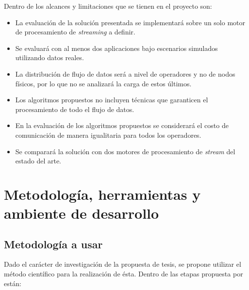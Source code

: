 \documentclass[12pt,letterpaper]{article}
\begin{document}
Dentro de los alcances y limitaciones que se tienen en el proyecto son:
\begin{itemize}
\item La evaluación de la solución presentada se implementará sobre un solo motor de procesamiento de \textsl{streaming} a definir.
\item Se evaluará con al menos dos aplicaciones bajo escenarios simulados utilizando datos reales.
\item La distribución de flujo de datos será a nivel de operadores y no de nodos f\'isicos, por lo que no se analizará la carga de estos \'ultimos.
\item Los algoritmos propuestos no incluyen t\'ecnicas que garanticen el procesamiento de todo el flujo de datos.
\item En la evaluación de los algoritmos propuestos se considerará el costo de comunicación de manera igualitaria para todos los operadores.
\item Se comparará la solución con dos motores de procesamiento de \textsl{stream} del estado del arte.
\end{itemize}

\section{Metodología, herramientas y ambiente de desarrollo}
\subsection{Metodología a usar}
Dado el carácter de investigación de la propuesta de tesis, se propone utilizar el método científico para la realización de ésta. Dentro de las etapas propuesta por \cite{hernandez2010metodologia} están:
\end{document}
